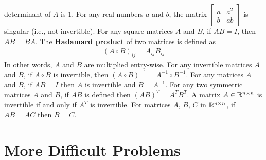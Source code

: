 \begin{tasks}[resume, style=enumerate]
  determinant of $A$ is $1$.
\task
For any real numbers $a$ and $b$, the matrix $\begin{bmatrix} a & a^2
  \\ b & ab \end{bmatrix}$ is singular (i.e., not invertible).
\task
  For any square matrices $A$ and $B$, if $AB = I$, then $AB = BA$.
\task
  The \textbf{Hadamard product} of two matrices is defined as
  \begin{align*}
    (A \circ B)_{ij} = A_{ij} B_{ij}
  \end{align*}
  In other words, $A$ and $B$ are multiplied entry-wise.  For any
  invertible matrices $A$ and $B$, if $A \circ B$ is invertible, then
  $(A \circ B)^{-1} = A^{-1} \circ B^{-1}$.
\task
   For any matrices $A$ and $B$, if $AB = I$ then $A$ is invertible
   and $B = A^{-1}$.
\task
  For any two symmetric matrices $A$ and $B$, if $AB$ is defined then
  $(AB)^T = A^TB^T$.
\task
  A matrix $A \in \mathbb R^{n \times n}$ is invertible if and only if $A^T$
  is invertible.
\task
  For matrices $A$, $B$, $C$ in $\mathbb R^{n \times n}$, if $AB = AC$ then $B
  = C$.
\end{tasks}

\section{More Difficult Problems}

